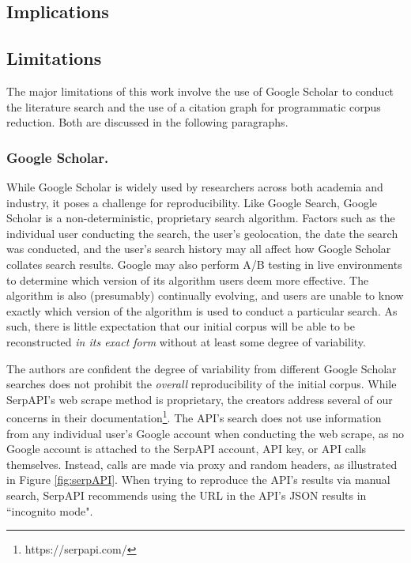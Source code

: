 \documentclass[manuscript,screen,review]{acmart}
\begin{document}
\subsection{Implications}


\subsection{Limitations}
The major limitations of this work involve the use of Google Scholar to conduct the literature search and the use of a citation graph for programmatic corpus reduction. Both are discussed in the following paragraphs.

\subsubsection{Google Scholar.} While Google Scholar is widely used by researchers across both academia and industry, it poses a challenge for reproducibility. Like Google Search, Google Scholar is a non-deterministic, proprietary search algorithm. Factors such as the individual user conducting the search, the user's geolocation, the date the search was conducted, and the user's search history may all affect how Google Scholar collates search results. Google may also perform A/B testing in live environments to determine which version of its algorithm users deem more effective. The algorithm is also (presumably) continually evolving, and users are unable to know exactly which version of the algorithm is used to conduct a particular search. As such, there is little expectation that our initial corpus will be able to be reconstructed \textit{in its exact form} without at least some degree of variability.

The authors are confident the degree of variability from different Google Scholar searches does not prohibit the \textit{overall} reproducibility of the initial corpus. While SerpAPI's web scrape method is proprietary, the creators address several of our concerns in their documentation\footnote{https://serpapi.com/}. The API's search does not use information from any individual user's Google account when conducting the web scrape, as no Google account is attached to the SerpAPI account, API key, or API calls themselves. Instead, calls are made via proxy and random headers, as illustrated in Figure \ref{fig:serpAPI}. When trying to reproduce the API's results via manual search, SerpAPI recommends using the URL in the API's JSON results in ``incognito mode". 
\end{document}
